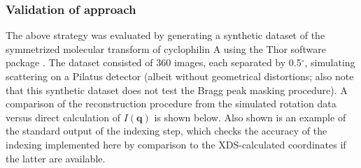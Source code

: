\documentclass{article}
\begin{document}
\subsubsection{Validation of approach}

The above strategy was evaluated by generating a synthetic dataset of the symmetrized molecular transform of cyclophilin A using the Thor software package \cite{thor}. The dataset consisted of 360 images, each separated by 0.5$^{\circ}$, simulating scattering on a Pilatus detector (albeit without geometrical distortions; also note that this synthetic dataset does not test the Bragg peak masking procedure). A comparison of the reconstruction procedure from the simulated rotation data versus direct calculation of $I(\mathbf{q})$ is shown below. Also shown is an example of the standard output of the indexing step, which checks the accuracy of the indexing implemented here by comparison to the XDS-calculated coordinates if the latter are available.
\end{document}
